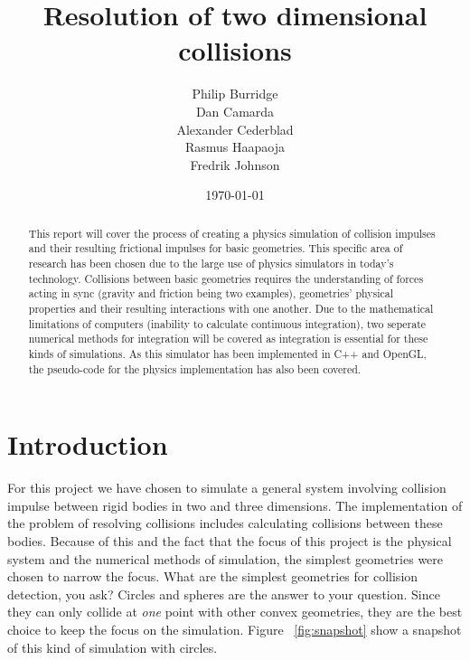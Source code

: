 \documentclass[a4paper,12pt]{report}
\title{Resolution of two dimensional collisions}
\author{Philip Burridge\\
        Dan Camarda\\
        Alexander Cederblad\\
        Rasmus Haapaoja\\
        Fredrik Johnson}
\date{\today}
\begin{document}
\maketitle


\begin{abstract}
This report will cover the process of creating a physics simulation of collision impulses and their resulting frictional impulses for basic geometries. This specific area of research has been chosen due to the large use of physics simulators in today's technology. Collisions between basic geometries requires the understanding of forces acting in sync (gravity and friction being two examples), geometries' physical properties and their resulting interactions with one another. Due to the mathematical limitations of computers (inability to calculate continuous integration), two seperate numerical methods for integration will be covered as integration is essential for these kinds of simulations. As this simulator has been implemented in C++ and OpenGL, the pseudo-code for the physics implementation has also been covered.
\end{abstract}


\tableofcontents
{}


\chapter{Introduction}
\setcounter{page}{1}

For this project we have chosen to simulate a general system involving collision impulse between rigid bodies in two and three dimensions. The implementation of the problem of resolving collisions includes calculating collisions between these bodies. Because of this and the fact that the focus of this project is the physical system and the numerical methods of simulation, the simplest geometries were chosen to narrow the focus. What are the simplest geometries for collision detection, you ask? Circles and spheres are the answer to your question. Since they can only collide at \emph{one} point with other convex geometries, they are the best choice to keep the focus on the simulation. Figure ~\ref{fig:snapshot} show a snapshot of this kind of simulation with circles.
\end{document}
